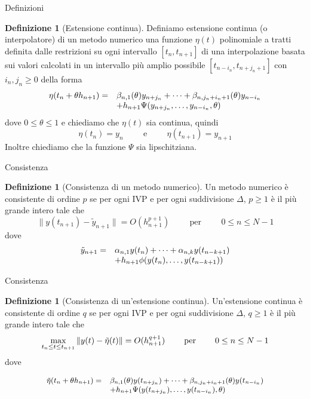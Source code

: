 \documentclass[intlimits]{beamer}
\numberwithin{equation}{section}
\theoremstyle{plain}
\theoremstyle{definition}
\newtheorem{defin}[teor]{Definizione}
\theoremstyle{remark}
\begin{document}
\begin{frame}{Definizioni}
 \begin{defin}[Estensione continua]
 Definiamo estensione continua (o interpolatore) di un metodo numerico una funzione $\eta(t)$ 
polinomiale a tratti definita dalle restrizioni su ogni intervallo $[t_n,t_{n+1}]$ di una interpolazione 
basata sui valori calcolati in un intervallo più amplio possibile $[t_{n-i_n},t_{n+j_n+1}]$ con 
$i_n,j_n \geq 0$ della forma
$$
\begin{array}{c lc}
\eta(t_n+\theta h_{n+1}) = & \beta_{n,1} (\theta) y_{n+j_n} + \dots + \beta_{n,j_n + i_n + 1} (\theta) y_{n-i_n} \\
			 & + h_{n+1} \Psi (y_{n+j_n}, \dots , y_{n-i_n}, \theta)
\end{array}
$$
dove $0 \le \theta \le 1$ e chiediamo che $\eta(t)$ sia continua, quindi
$$
\eta(t_n)=y_n	\hspace{1cm}	\mbox{e}	\hspace{1cm} \eta(t_{n+1})=y_{n+1}
$$
Inoltre chiediamo che la funzione $\Psi$ sia lipschitziana.
\end{defin}
\end{frame}

\begin{frame}{Consistenza}
 \begin{defin}[Consistenza di un metodo numerico]
 Un metodo numerico è consistente di ordine $p$ se per ogni IVP e per ogni suddivisione $\Delta$, 
 $p \geq 1$ è il più grande intero tale che 
 $$
 \| y(t_{n+1}) - \tilde{y}_{n+1}  \| = O(h_{n+1}^{p+1})
\hspace{1cm}	
\mbox{per}
\hspace{1cm}
0 \le n \le N-1
 $$
dove
$$
\begin{array}{c lc}
\tilde{y}_{n+1} = 	&	\alpha_{n,1} y(t_n) + \dots +\alpha_{n,k} y (t_{n-k+1}) \\ 
			&	+h_{n+1} \phi (y(t_n), \dots , y(t_{n-k+1}))
\end{array}
$$
\end{defin}
\end{frame}


\begin{frame}{Consistenza}
\begin{defin}[Consistenza di un'estensione continua]
Un'estensione continua è consistente di ordine $q$ se per ogni IVP e per ogni suddivisione $\Delta$, 
$q \geq 1$ è il più grande intero tale che 
 $$
\max_{t_n \le t \le t_{n+1}}
 \| y(t) - \tilde{\eta}(t)  \| = O(h_{n+1}^{q+1})
\hspace{0.8cm}	
\mbox{per}
\hspace{0.8cm}
0 \le n \le N-1
 $$
 dove


$$
\small{
\begin{array}{l lc}
\tilde{\eta}(t_n+\theta h_{n+1}) =	 & \beta_{n,1} (\theta) y(t_{n+j_n}) + \dots + 
					    \beta_{n,j_n + i_n + 1} (\theta) y(t_{n-i_n})\\
					  & + h_{n+1} \Psi (y(t_{n+j_n}), \dots , y(t_{n-i_n}), \theta)	
\end{array}
}
$$
\end{defin}
\end{frame}
\end{document}
